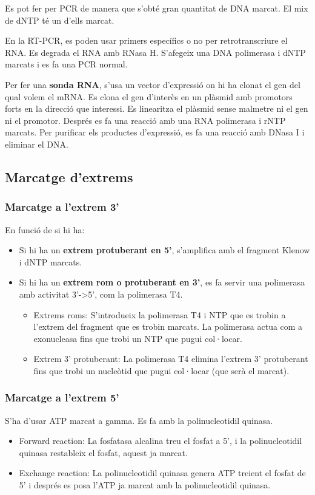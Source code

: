 Es pot fer per PCR de manera que s'obté gran quantitat de DNA marcat. El mix de dNTP té un d'ells marcat.

En la RT-PCR, es poden usar primers específics o no per retrotranscriure el RNA. Es degrada el RNA amb RNasa H. S'afegeix una DNA polimerasa i dNTP marcats i es fa una PCR normal.

Per fer una \textbf{sonda RNA}, s'usa un vector d'expressió on hi ha clonat el gen del qual volem el mRNA. Es clona el gen d'interès en un plàsmid amb promotors forts en la direcció que interessi. Es linearitza el plàsmid sense malmetre ni el gen ni el promotor. Després es fa una reacció amb una RNA polimerasa i rNTP marcats. Per purificar els productes d'expressió, es fa una reacció amb DNasa I i eliminar el DNA.

\subsection{Marcatge d'extrems}
\subsubsection{Marcatge a l'extrem 3'}
En funció de si hi ha:
\begin{itemize}
\item Si hi ha un \textbf{extrem protuberant en 5'}, s'amplifica amb el fragment Klenow i dNTP marcats.
\item Si hi ha un \textbf{extrem rom o protuberant en 3'}, es fa servir una polimerasa amb activitat 3'->5', com la polimerasa T4.
  \begin{itemize}
  \item Extrems roms: S'introdueix la polimerasa T4 i NTP que es trobin a l'extrem del fragment que es trobin marcats. La polimerasa actua com a exonucleasa fins que trobi un NTP que pugui col·locar.
  \item Extrem 3' protuberant: La polimerasa T4 elimina l'extrem 3' protuberant fins que trobi un nucleòtid que pugui col·locar (que serà el marcat).
  \end{itemize}
\end{itemize}

\subsubsection{Marcatge a l'extrem 5'}
S'ha d'usar ATP marcat a gamma. Es fa amb la polinucleotidil quinasa.

\begin{itemize}
\item Forward reaction: La fosfatasa alcalina treu el fosfat a 5', i la polinucleotidil quinasa restableix el fosfat, aquest ja marcat.

\item Exchange reaction: La polinucleotidil quinasa genera ATP treient el fosfat de 5' i després es posa l'ATP ja marcat amb la polinucleotidil quinasa.
\end{itemize}

